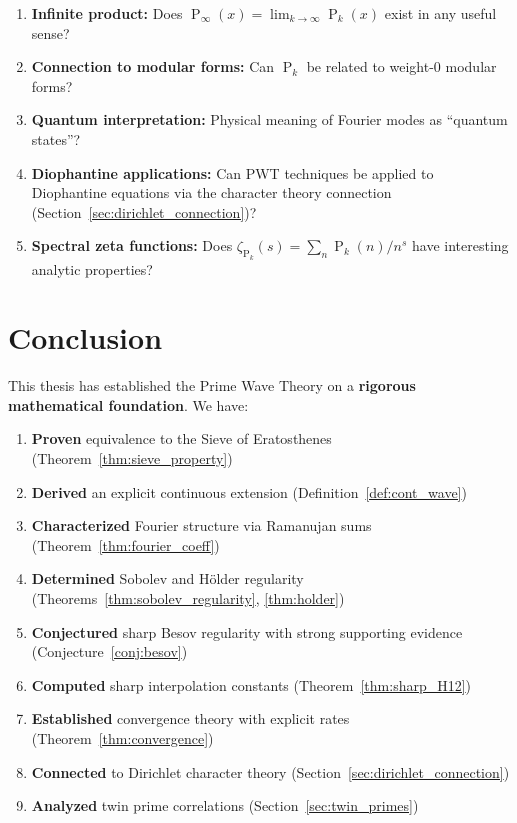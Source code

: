 ﻿\documentclass[12pt,a4paper]{report}
\theoremstyle{plain}
\theoremstyle{definition}
\DeclareMathOperator{\Pk}{P}
\begin{document}
\begin{enumerate}
    \item \textbf{Infinite product:} Does $\Pk_\infty(x) = \lim_{k\to\infty} \Pk_k(x)$ exist in any useful sense?
    
    \item \textbf{Connection to modular forms:} Can $\Pk_k$ be related to weight-0 modular forms?
    
    \item \textbf{Quantum interpretation:} Physical meaning of Fourier modes as ``quantum states''?
    
    \item \textbf{Diophantine applications:} Can PWT techniques be applied to Diophantine equations via the character theory connection (Section~\ref{sec:dirichlet_connection})?
    
    \item \textbf{Spectral zeta functions:} Does $\zeta_{\Pk_k}(s) = \sum_{n} \Pk_k(n)/n^s$ have interesting analytic properties?
\end{enumerate}

\chapter{Conclusion}
\label{ch:conclusion}

This thesis has established the Prime Wave Theory on a \textbf{rigorous mathematical foundation}. We have:

\begin{enumerate}
    \item \textbf{Proven} equivalence to the Sieve of Eratosthenes (Theorem~\ref{thm:sieve_property})
    \item \textbf{Derived} an explicit continuous extension (Definition~\ref{def:cont_wave})
    \item \textbf{Characterized} Fourier structure via Ramanujan sums (Theorem~\ref{thm:fourier_coeff})
    \item \textbf{Determined} Sobolev and H\"older regularity (Theorems~\ref{thm:sobolev_regularity}, \ref{thm:holder})
    \item \textbf{Conjectured} sharp Besov regularity with strong supporting evidence (Conjecture~\ref{conj:besov})
    \item \textbf{Computed} sharp interpolation constants (Theorem~\ref{thm:sharp_H12})
    \item \textbf{Established} convergence theory with explicit rates (Theorem~\ref{thm:convergence})
    \item \textbf{Connected} to Dirichlet character theory (Section~\ref{sec:dirichlet_connection})
    \item \textbf{Analyzed} twin prime correlations (Section~\ref{sec:twin_primes})
\end{enumerate}
\end{document}
